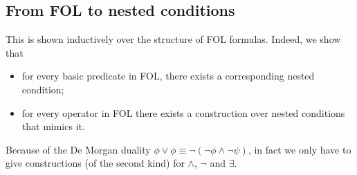 \subsection{From FOL to nested conditions}

This is shown inductively over the structure of FOL formulas. Indeed, we show that
\begin{itemize}
\item for every basic predicate in FOL, there exists a corresponding nested condition;
\item for every operator in FOL there exists a construction over nested conditions that mimics it.
\end{itemize}
%
Because of the De Morgan duality $\phi\vee \phi\equiv \neg(\neg\phi\wedge \neg\psi)$, in fact we only have to give constructions (of the second kind) for $\wedge$, $\neg$ and $\exists$.

